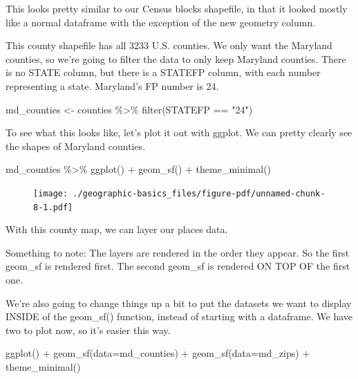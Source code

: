 \documentclass[
  letterpaper,
  DIV=11,
  numbers=noendperiod]{scrreprt}
\newenvironment{Shaded}{\begin{snugshade}}{\end{snugshade}}
\newcommand{\AttributeTok}[1]{\textcolor[rgb]{0.40,0.45,0.13}{#1}}
\newcommand{\FunctionTok}[1]{\textcolor[rgb]{0.28,0.35,0.67}{#1}}
\newcommand{\NormalTok}[1]{\textcolor[rgb]{0.00,0.23,0.31}{#1}}
\newcommand{\OtherTok}[1]{\textcolor[rgb]{0.00,0.23,0.31}{#1}}
\newcommand{\SpecialCharTok}[1]{\textcolor[rgb]{0.37,0.37,0.37}{#1}}
\newcommand{\StringTok}[1]{\textcolor[rgb]{0.13,0.47,0.30}{#1}}
\begin{document}
This looks pretty similar to our Census blocks shapefile, in that it
looked mostly like a normal dataframe with the exception of the new
geometry column.

This county shapefile has all 3233 U.S. counties. We only want the
Maryland counties, so we're going to filter the data to only keep
Maryland counties. There is no STATE column, but there is a STATEFP
column, with each number representing a state. Maryland's FP number is
24.

\begin{Shaded}
\begin{Highlighting}[]
\NormalTok{md\_counties }\OtherTok{\textless{}{-}}\NormalTok{ counties }\SpecialCharTok{\%\textgreater{}\%}
  \FunctionTok{filter}\NormalTok{(STATEFP }\SpecialCharTok{==} \StringTok{"24"}\NormalTok{)}
\end{Highlighting}
\end{Shaded}

To see what this looks like, let's plot it out with ggplot. We can
pretty clearly see the shapes of Maryland counties.

\begin{Shaded}
\begin{Highlighting}[]
\NormalTok{md\_counties }\SpecialCharTok{\%\textgreater{}\%}
  \FunctionTok{ggplot}\NormalTok{() }\SpecialCharTok{+}
  \FunctionTok{geom\_sf}\NormalTok{() }\SpecialCharTok{+}
  \FunctionTok{theme\_minimal}\NormalTok{()}
\end{Highlighting}
\end{Shaded}

\begin{figure}[H]

{\centering \texttt{[image: ./geographic-basics\_files/figure-pdf/unnamed-chunk-8-1.pdf]}

}

\end{figure}

With this county map, we can layer our places data.

Something to note: The layers are rendered in the order they appear. So
the first geom\_sf is rendered first. The second geom\_sf is rendered ON
TOP OF the first one.

We're also going to change things up a bit to put the datasets we want
to display INSIDE of the geom\_sf() function, instead of starting with a
dataframe. We have two to plot now, so it's easier this way.

\begin{Shaded}
\begin{Highlighting}[]
\FunctionTok{ggplot}\NormalTok{() }\SpecialCharTok{+}
  \FunctionTok{geom\_sf}\NormalTok{(}\AttributeTok{data=}\NormalTok{md\_counties) }\SpecialCharTok{+}
  \FunctionTok{geom\_sf}\NormalTok{(}\AttributeTok{data=}\NormalTok{md\_zips) }\SpecialCharTok{+}
  \FunctionTok{theme\_minimal}\NormalTok{()}
\end{Highlighting}
\end{Shaded}
\end{document}

